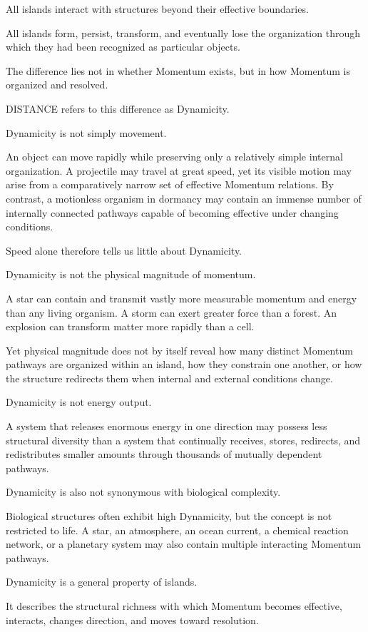 All islands interact with structures beyond their effective boundaries.

All islands form, persist, transform, and eventually lose the organization through which they had been recognized as particular objects.

The difference lies not in whether Momentum exists, but in how Momentum is organized and resolved.

DISTANCE refers to this difference as Dynamicity.

Dynamicity is not simply movement.

An object can move rapidly while preserving only a relatively simple internal organization. A projectile may travel at great speed, yet its visible motion may arise from a comparatively narrow set of effective Momentum relations. By contrast, a motionless organism in dormancy may contain an immense number of internally connected pathways capable of becoming effective under changing conditions.

Speed alone therefore tells us little about Dynamicity.

Dynamicity is not the physical magnitude of momentum.

A star can contain and transmit vastly more measurable momentum and energy than any living organism. A storm can exert greater force than a forest. An explosion can transform matter more rapidly than a cell.

Yet physical magnitude does not by itself reveal how many distinct Momentum pathways are organized within an island, how they constrain one another, or how the structure redirects them when internal and external conditions change.

Dynamicity is not energy output.

A system that releases enormous energy in one direction may possess less structural diversity than a system that continually receives, stores, redirects, and redistributes smaller amounts through thousands of mutually dependent pathways.

Dynamicity is also not synonymous with biological complexity.

Biological structures often exhibit high Dynamicity, but the concept is not restricted to life. A star, an atmosphere, an ocean current, a chemical reaction network, or a planetary system may also contain multiple interacting Momentum pathways.

Dynamicity is a general property of islands.

It describes the structural richness with which Momentum becomes effective, interacts, changes direction, and moves toward resolution.

